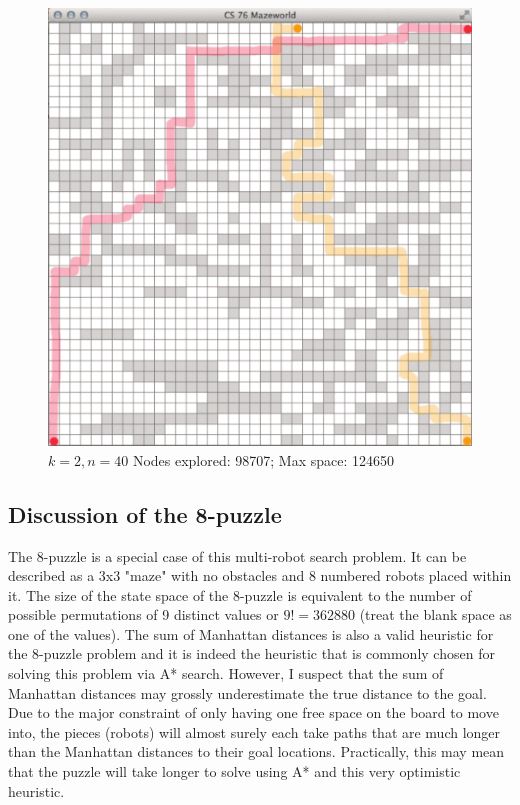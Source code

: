 \documentclass{article}
\begin{document}
\begin{figure}[!htb]
\centering
\includegraphics[scale=.75]{multimaze40.pdf}
\caption{{\bf $k=2, n=40$} Nodes explored: 98707; Max space: 124650}
\end{figure}

\subsection{Discussion of the 8-puzzle}

The 8-puzzle is a special case of this multi-robot search problem. It can be described as a 3x3 "maze" with no obstacles and 8 numbered robots placed within it. The size of the state space of the 8-puzzle is equivalent to the number of possible permutations of 9 distinct values or $9!=362880$ (treat the blank space as one of the values). The sum of Manhattan distances is also a valid heuristic for the 8-puzzle problem and it is indeed the heuristic that is commonly chosen for solving this problem via A* search. However, I suspect that the sum of Manhattan distances may grossly underestimate the true distance to the goal. Due to the major constraint of only having one free space on the board to move into, the pieces (robots) will almost surely each take paths that are much longer than the Manhattan distances to their goal locations. Practically, this may mean that the puzzle will take longer to solve using A* and this very optimistic heuristic.
\end{document}
